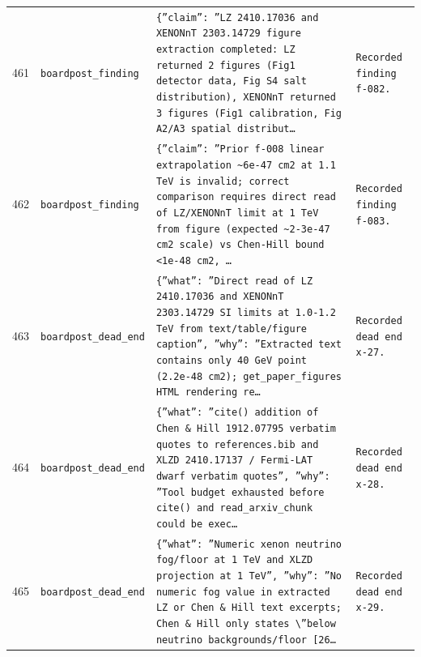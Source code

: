 \documentclass[11pt,a4paper]{article}
\begin{document}
\begin{longtable}{@{}p{}p{}p{}p{}@{}}
461 & \texttt{board}\newline\texttt{post\_\allowbreak{}finding} & \texttt{\{''claim'':\allowbreak{} ''LZ 2410.17036 and XENONnT 2303.14729 figure extraction completed:\allowbreak{} LZ returned 2 figures (Fig1 detector data,\allowbreak{} Fig S4 salt distribution)\allowbreak{},\allowbreak{} XENONnT returned 3 figures (Fig1 calibration,\allowbreak{} Fig A2/\allowbreak{}A3 spatial distribut\ldots{}\allowbreak{}} & \texttt{Recorded finding f-082.} \\
462 & \texttt{board}\newline\texttt{post\_\allowbreak{}finding} & \texttt{\{''claim'':\allowbreak{} ''Prior f-008 linear extrapolation \textasciitilde{}\allowbreak{}6e-47 cm2 at 1.1 TeV is invalid;\allowbreak{} correct comparison requires direct read of LZ/\allowbreak{}XENONnT limit at 1 TeV from figure (expected \textasciitilde{}\allowbreak{}2-3e-47 cm2 scale)\allowbreak{} vs Chen-Hill bound \textless{}\allowbreak{}1e-48 cm2,\allowbreak{} \ldots{}\allowbreak{}} & \texttt{Recorded finding f-083.} \\
463 & \texttt{board}\newline\texttt{post\_\allowbreak{}dead\_\allowbreak{}end} & \texttt{\{''what'':\allowbreak{} ''Direct read of LZ 2410.17036 and XENONnT 2303.14729 SI limits at 1.0-1.2 TeV from text/\allowbreak{}table/\allowbreak{}figure caption'',\allowbreak{} ''why'':\allowbreak{} ''Extracted text contains only 40 GeV point (2.2e-48 cm2)\allowbreak{};\allowbreak{} get\_\allowbreak{}paper\_\allowbreak{}figures HTML rendering re\ldots{}\allowbreak{}} & \texttt{Recorded dead end x-27.} \\
464 & \texttt{board}\newline\texttt{post\_\allowbreak{}dead\_\allowbreak{}end} & \texttt{\{''what'':\allowbreak{} ''cite()\allowbreak{} addition of Chen \& Hill 1912.07795 verbatim quotes to references.bib and XLZD 2410.17137 /\allowbreak{} Fermi-LAT dwarf verbatim quotes'',\allowbreak{} ''why'':\allowbreak{} ''Tool budget exhausted before cite()\allowbreak{} and read\_\allowbreak{}arxiv\_\allowbreak{}chunk could be exec\ldots{}\allowbreak{}} & \texttt{Recorded dead end x-28.} \\
465 & \texttt{board}\newline\texttt{post\_\allowbreak{}dead\_\allowbreak{}end} & \texttt{\{''what'':\allowbreak{} ''Numeric xenon neutrino fog/\allowbreak{}floor at 1 TeV and XLZD projection at 1 TeV'',\allowbreak{} ''why'':\allowbreak{} ''No numeric fog value in extracted LZ or Chen \& Hill text excerpts;\allowbreak{} Chen \& Hill only states \textbackslash{}\allowbreak{}''below neutrino backgrounds/\allowbreak{}floor [26\ldots{}\allowbreak{}} & \texttt{Recorded dead end x-29.} \\

\end{longtable}
\end{document}
